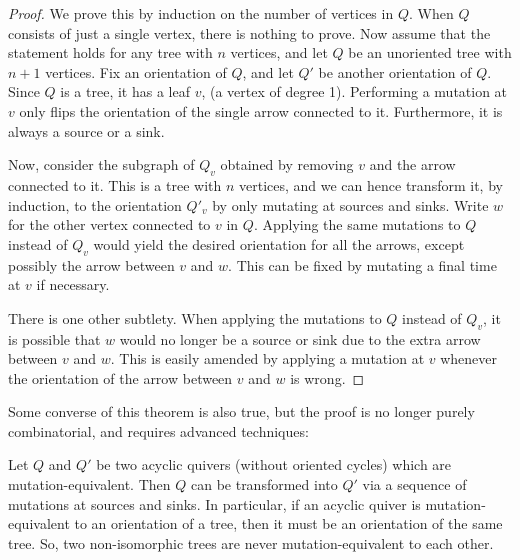 \begin{proof}
	We prove this by induction on the number of vertices in $Q$. When $Q$ consists of just a single vertex, there is nothing to prove. Now assume that the statement holds for any tree with $n$ vertices, and let $Q$ be an unoriented tree with $n+1$ vertices. Fix an orientation of $Q$, and let $Q'$ be another orientation of $Q$. Since $Q$ is a tree, it has a leaf $v$, (a vertex of degree 1). Performing a mutation at $v$ only flips the orientation of the single arrow connected to it. Furthermore, it is always a source or a sink.

	Now, consider the subgraph of $Q_v$ obtained by removing $v$ and the arrow connected to
	it. This is a tree with $n$ vertices, and we can hence transform it, by induction, to
	the orientation $Q'_v$ by only mutating at sources and sinks. Write $w$ for the other
	vertex connected to $v$ in $Q$. Applying the same mutations to $Q$ instead of $Q_v$
	would yield the desired orientation for all the arrows, except possibly the arrow
	between $v$ and $w$. This can be fixed by mutating a final time at $v$ if necessary.

	There is one other subtlety. When applying the mutations to $Q$ instead of $Q_v$, it is
	possible that $w$ would no longer be a source or sink due to the extra arrow between
	$v$ and $w$. This is easily amended by applying a mutation at $v$ whenever the
	orientation of the arrow between $v$ and $w$ is wrong.
\end{proof}
Some converse of this theorem is also true, but the proof is no longer purely combinatorial, and requires advanced techniques:
\begin{theorem}

	Let $Q$ and $Q'$ be two acyclic quivers (without oriented cycles)
	which are mutation-equivalent. Then $Q$ can be transformed into $Q'$ via a sequence of
	mutations at sources and sinks. In particular, if an acyclic quiver is
	mutation-equivalent to an orientation of a tree, then it must be an orientation of the
	same tree. So, two non-isomorphic trees are never mutation-equivalent to each other.
\end{theorem}

